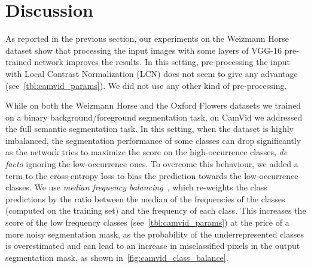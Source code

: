 
\section{Discussion}

As reported in the previous section, our experiments on the Weizmann Horse
dataset show that processing the input images with some layers of VGG-16
pre-trained network improves the results. In this setting, pre-processing the input
with Local Contrast Normalization (LCN) does not seem to give any advantage
(see~\autoref{tbl:camvid_params}). We did not use any other kind of
pre-processing.

While on both the Weizmann Horse and the Oxford Flowers datasets we trained on
a binary background/foreground segmentation task, on CamVid we addressed the
full semantic segmentation task. In this setting, when the dataset is highly
imbalanced, the segmentation performance of some classes can drop
significantly as the network tries to maximize the score on the high-occurrence
classes, {\em de facto} ignoring the low-occurrence ones. To overcome this behaviour,
we added a term to the cross-entropy loss to bias the prediction towards the
low-occurrence classes. We use \emph{median frequency
balancing}~\cite{Eigen2015}, which re-weights the class predictions by the
ratio between the median of the frequencies of the classes (computed on the
training set) and the frequency of each class.
This increases the score of the low frequency classes
(see~\autoref{tbl:camvid_params}) at the price of a more noisy segmentation
mask, as the probability of the underrepresented classes is overestimated and
can lead to an increase in misclassified pixels in the output segmentation
mask, as shown in~\autoref{fig:camvid_class_balance}.

